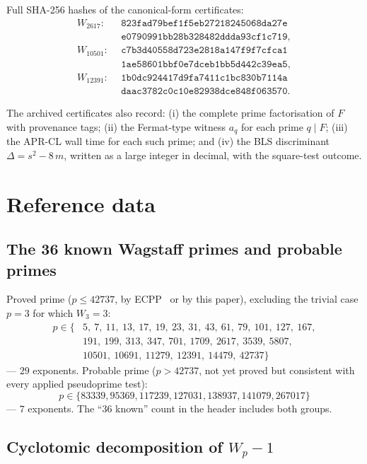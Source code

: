 \documentclass[11pt,a4paper]{amsart}
\theoremstyle{plain}
\theoremstyle{definition}
\begin{document}
{\small\noindent Full SHA-256 hashes of the canonical-form certificates:
\begin{align*}
W_{2617}:\ \  & \mathtt{823fad79bef1f5eb27218245068da27e}\allowbreak \\
              & \mathtt{e0790991bb28b328482ddda93cf1c719}, \\
W_{10501}:\ \ & \mathtt{c7b3d40558d723e2818a147f9f7cfca1}\allowbreak \\
              & \mathtt{1ae58601bbf0e7dceb1bb5d442c39ea5}, \\
W_{12391}:\ \ & \mathtt{1b0dc924417d9fa7411c1bc830b7114a}\allowbreak \\
              & \mathtt{daac3782c0c10e82938dce848f063570}.
\end{align*}}

The archived certificates also record: (i) the complete prime
factorisation of $F$ with provenance tags; (ii) the Fermat-type
witness $a_q$ for each prime $q \mid F$; (iii) the APR-CL wall time
for each such prime; and (iv) the BLS discriminant
$\Delta = s^2 - 8\,m$, written as a large integer in decimal, with
the square-test outcome.

\section{Reference data}
\label{sec:appendix}

\subsection{The 36 known Wagstaff primes and probable primes}

Proved prime ($p \leq 42737$, by ECPP~\cite{AtkinMorain} or by this
paper), excluding the trivial case $p = 3$ for which $W_3 = 3$:
\begin{align*}
p \in \{ & 5,\ 7,\ 11,\ 13,\ 17,\ 19,\ 23,\ 31,\ 43,\ 61,\ 79,\ 101,\ 127,\ 167, \\
         & 191,\ 199,\ 313,\ 347,\ 701,\ 1709,\ 2617,\ 3539,\ 5807, \\
         & 10501,\ 10691,\ 11279,\ 12391,\ 14479,\ 42737 \}
\end{align*}
--- $29$ exponents. Probable prime ($p > 42737$, not yet proved but
consistent with every applied pseudoprime test):
\[
  p \in \{83339, 95369, 117239, 127031, 138937, 141079, 267017\}
\]
--- $7$ exponents. The ``$36$ known'' count in the header includes both
groups.

\subsection{Cyclotomic decomposition of $W_p - 1$}
\end{document}
